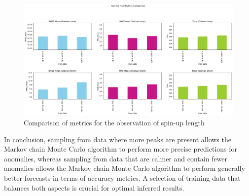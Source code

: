 \begin{figure}[H]
    \centering
    \includegraphics[width=.8\textwidth]{figures/time_series_analysis/comparison/spin_up.png}
    \captionsetup{width=.8\textwidth}
    \caption{Comparison of metrics for the observation of spin-up length}
\end{figure}

In conclusion, sampling from data where more peaks are present allows the Markov chain Monte Carlo algorithm to perform more precise predictions for anomalies, whereas sampling from data that are calmer and contain fewer anomalies allows the Markov chain Monte Carlo algorithm to perform generally better forecasts in terms of accuracy metrics. A selection of training data that balances both aspects is crucial for optimal inferred results.
